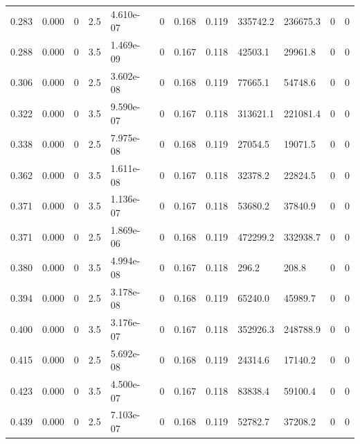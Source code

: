 \documentclass[preview]{standalone}
\begin{document}
{{\begin{tabular}{L{1.2cm}C{1.2cm} C{0.3cm}C{0.5cm} C{1.4cm}C{1.4cm} C{1.4cm}C{1.4cm} C{1.6cm}C{1.6cm} C{1.6cm}C{1.6cm}}
  0.283  &  0.000  & 0     & 2.5 &  4.610e-07  & 0  &  0.168&   0.119& 335742.2 & 236675.3   &  0 & 0  \\ 
  0.288  &  0.000  & 0     & 3.5 &  1.469e-09  & 0  &  0.167&   0.118& 42503.1 & 29961.8   &  0 & 0  \\ 
  0.306  &  0.000  & 0     & 2.5 &  3.602e-08  & 0  &  0.168&   0.119& 77665.1 & 54748.6   &  0 & 0  \\ 
  0.322  &  0.000  & 0     & 3.5 &  9.590e-07  & 0  &  0.167&   0.118& 313621.1 & 221081.4   &  0 & 0  \\ 
  0.338  &  0.000  & 0     & 2.5 &  7.975e-08  & 0  &  0.168&   0.119& 27054.5 & 19071.5   &  0 & 0  \\ 
  0.362  &  0.000  & 0     & 3.5 &  1.611e-08  & 0  &  0.167&   0.118& 32378.2 & 22824.5   &  0 & 0  \\ 
  0.371  &  0.000  & 0     & 3.5 &  1.136e-07  & 0  &  0.167&   0.118& 53680.2 & 37840.9   &  0 & 0  \\ 
  0.371  &  0.000  & 0     & 2.5 &  1.869e-06  & 0  &  0.168&   0.119& 472299.2 & 332938.7   &  0 & 0  \\ 
  0.380  &  0.000  & 0     & 3.5 &  4.994e-08  & 0  &  0.167&   0.118& 296.2 & 208.8   &  0 & 0  \\ 
  0.394  &  0.000  & 0     & 2.5 &  3.178e-08  & 0  &  0.168&   0.119& 65240.0 & 45989.7   &  0 & 0  \\ 
  0.400  &  0.000  & 0     & 3.5 &  3.176e-07  & 0  &  0.167&   0.118& 352926.3 & 248788.9   &  0 & 0  \\ 
  0.415  &  0.000  & 0     & 2.5 &  5.692e-08  & 0  &  0.168&   0.119& 24314.6 & 17140.2   &  0 & 0  \\ 
  0.423  &  0.000  & 0     & 3.5 &  4.500e-07  & 0  &  0.167&   0.118& 83838.4 & 59100.4   &  0 & 0  \\ 
  0.439  &  0.000  & 0     & 2.5 &  7.103e-07  & 0  &  0.168&   0.119& 52782.7 & 37208.2   &  0 & 0  \\ 
\hline 
\end{tabular} 

}}
\end{document}
